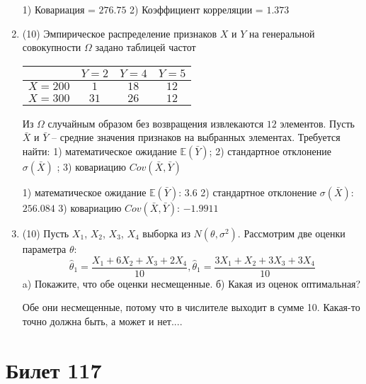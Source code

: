 \documentclass[a4paper,12pt]{article}
\begin{document}
\begin{enumerate}
1) Ковариация = $276.75$
2) Коэффициент корреляции = $1.373$


\item


(10) Эмпирическое распределение признаков $X$ и $Y$ на генеральной совокупности $\Omega$ задано таблицей частот  
 
\begin{tabular}{ | c | c | c | c | }
\hline
 & $Y = 2$ & $Y = 4$ & $Y = 5$  \\ \hline
$X = 200$ & $1$ & $18$ & $12$\\ \hline
$X = 300$ & $31$ & $26$ & $12$\\
\hline
\end{tabular}

Из $\Omega$ случайным образом без возвращения извлекаются $12$ элементов. 
Пусть $\bar X$ и $\bar Y$ – средние значения признаков на выбранных элементах. 
Требуется найти: 1) математическое ожидание $\mathbb{E}(\bar Y)$; 2) стандартное отклонение $\sigma(\bar X)$ ; 
3) ковариацию $Cov(\bar X, \bar Y)$




1) математическое ожидание $\mathbb{E}(\bar Y)$: $3.6$ 
2) стандартное отклонение $\sigma(\bar X)$: $256.084$
3) ковариацию $Cov(\bar X, \bar Y)$: $-1.9911$


\item


(10) Пусть $X _{1}$, $X _{2}$, $X _{3}$, $X _{4}$ выборка из $N(\theta, \sigma ^{2})$. Рассмотрим две оценки параметра $\theta$:
\[\hat \theta _{1} = \frac{X _{1} + 6X _{2} + X _{3} + 2X _{4}}{10}, \hat \theta _{1} = \frac{3X _{1} + X _{2} + 3X _{3} + 3X _{4}}{10}\]
a) Покажите, что обе оценки несмещенные.
б) Какая из оценок оптимальная?




Обе они несмещенные, потому что в числителе выходит в сумме 10.
Какая-то точно должна быть, а может и нет....



\end{enumerate}

\section{Билет 117}
\end{document}
